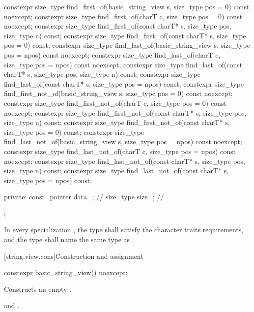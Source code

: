 \begin{codeblock}
{  constexpr size_type find_first_of(basic_string_view s, size_type pos = 0) const noexcept;
  constexpr size_type find_first_of(charT c, size_type pos = 0) const noexcept;
  constexpr size_type find_first_of(const charT* s, size_type pos, size_type n) const;
  constexpr size_type find_first_of(const charT* s, size_type pos = 0) const;
  constexpr size_type find_last_of(basic_string_view s, size_type pos = npos) const noexcept;
  constexpr size_type find_last_of(charT c, size_type pos = npos) const noexcept;
  constexpr size_type find_last_of(const charT* s, size_type pos, size_type n) const;
  constexpr size_type find_last_of(const charT* s, size_type pos = npos) const;
  constexpr size_type find_first_not_of(basic_string_view s, size_type pos = 0) const noexcept;
  constexpr size_type find_first_not_of(charT c, size_type pos = 0) const noexcept;
  constexpr size_type find_first_not_of(const charT* s, size_type pos,
                                        size_type n) const;
  constexpr size_type find_first_not_of(const charT* s, size_type pos = 0) const;
  constexpr size_type find_last_not_of(basic_string_view s,
                                       size_type pos = npos) const noexcept;
  constexpr size_type find_last_not_of(charT c, size_type pos = npos) const noexcept;
  constexpr size_type find_last_not_of(const charT* s, size_type pos,
                                       size_type n) const;
  constexpr size_type find_last_not_of(const charT* s, size_type pos = npos) const;

private:
  const_pointer data_; // \expos
  size_type size_;     // \expos
};
\end{codeblock}

\pnum
In every specialization , the type  shall satisfy the character traits requirements,
and the type  shall name the same type as .

[string.view.cons]{Construction and assignment}

%
\begin{itemdecl}
constexpr basic_string_view() noexcept;
\end{itemdecl}

\begin{itemdescr}
\pnum
\effects
Constructs an empty .

\pnum
\postconditions
{} and .
\end{itemdescr}


